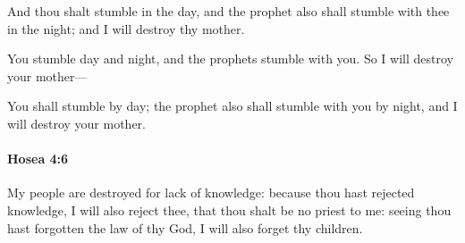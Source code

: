 			\begin{versebox}
					\item[BHS] 
					\item[LXX] 
					\item[ASV] And thou shalt stumble in the day, and the prophet also shall stumble with thee in the night; and I will destroy thy mother.
					\item[NIV] You stumble day and night, and the prophets stumble with you. So I will destroy your mother—
					\item[NRSV] You shall stumble by day; the prophet also shall stumble with you by night, and I will destroy your mother.
			\end{versebox}

		\paragraph{Hosea 4:6} %
			\label{HOSEA-4-6}

			My people are destroyed for lack of knowledge: because thou hast rejected knowledge, I will also reject thee, that thou shalt be no priest to me: seeing thou hast forgotten the law of thy God, I will also forget thy children.

